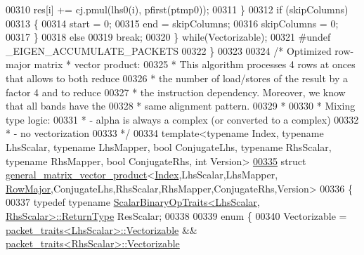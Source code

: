 \begin{DoxyCode}
{00310         res[i] += cj.pmul(lhs0(i), pfirst(ptmp0));
00311     \}
00312     \textcolor{keywordflow}{if} (skipColumns)
00313     \{
00314       start = 0;
00315       end = skipColumns;
00316       skipColumns = 0;
00317     \}
00318     \textcolor{keywordflow}{else}
00319       \textcolor{keywordflow}{break};
00320   \} \textcolor{keywordflow}{while}(Vectorizable);
00321 \textcolor{preprocessor}{  #undef \_EIGEN\_ACCUMULATE\_PACKETS}
00322 \}
00323 
00324 \textcolor{comment}{/* Optimized row-major matrix * vector product:}
00325 \textcolor{comment}{ * This algorithm processes 4 rows at onces that allows to both reduce}
00326 \textcolor{comment}{ * the number of load/stores of the result by a factor 4 and to reduce}
00327 \textcolor{comment}{ * the instruction dependency. Moreover, we know that all bands have the}
00328 \textcolor{comment}{ * same alignment pattern.}
00329 \textcolor{comment}{ *}
00330 \textcolor{comment}{ * Mixing type logic:}
00331 \textcolor{comment}{ *  - alpha is always a complex (or converted to a complex)}
00332 \textcolor{comment}{ *  - no vectorization}
00333 \textcolor{comment}{ */}
00334 \textcolor{keyword}{template}<\textcolor{keyword}{typename} Index, \textcolor{keyword}{typename} LhsScalar, \textcolor{keyword}{typename} LhsMapper, \textcolor{keywordtype}{bool} ConjugateLhs, \textcolor{keyword}{typename} RhsScalar, \textcolor{keyword}{
      typename} RhsMapper, \textcolor{keywordtype}{bool} ConjugateRhs, \textcolor{keywordtype}{int} Version>
\hyperlink{struct_eigen_1_1internal_1_1general__matrix__vector__product_3_01_index_00_01_lhs_scalar_00_01_l24320a1e63993864008333cadda60258}{00335} \textcolor{keyword}{struct }\hyperlink{struct_eigen_1_1internal_1_1general__matrix__vector__product}{general\_matrix\_vector\_product}<\hyperlink{namespace_eigen_a62e77e0933482dafde8fe197d9a2cfde}{Index},LhsScalar,LhsMapper,
      \hyperlink{group__enums_ggaacded1a18ae58b0f554751f6cdf9eb13acfcde9cd8677c5f7caf6bd603666aae3}{RowMajor},ConjugateLhs,RhsScalar,RhsMapper,ConjugateRhs,Version>
00336 \{
00337 \textcolor{keyword}{typedef} \textcolor{keyword}{typename} \hyperlink{group___core___module_struct_eigen_1_1_scalar_binary_op_traits}{ScalarBinaryOpTraits<LhsScalar, RhsScalar>::ReturnType}
       ResScalar;
00338 
00339 \textcolor{keyword}{enum} \{
00340   Vectorizable = \hyperlink{struct_eigen_1_1internal_1_1packet__traits}{packet\_traits<LhsScalar>::Vectorizable} && 
      \hyperlink{struct_eigen_1_1internal_1_1packet__traits}{packet\_traits<RhsScalar>::Vectorizable}
}
\end{DoxyCode}
